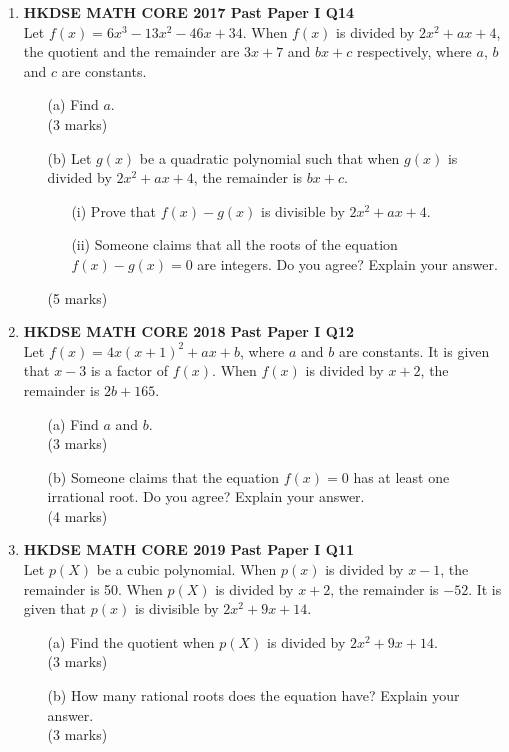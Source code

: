 \documentclass[12pt]{article}
\begin{document}
\begin{enumerate}
	\item \textbf{HKDSE MATH CORE 2017 Past Paper I Q14}\\
	Let $f(x) = 6x^3 - 13x^2 - 46x + 34$. When $f(x)$ is divided by $2x^2 + ax + 4$, the quotient and the remainder are $3x + 7$ and $bx + c$ respectively, where $a$, $b$ and $c$ are constants.
	\begin{enumerate}
		\item[(a)] Find $a$. \\(3 marks)
		\item[(b)] Let $g(x)$ be a quadratic polynomial such that when $g(x)$ is divided by $2x^2 + ax + 4$, the remainder is $bx + c$.
		\begin{enumerate}
			\item[(i)] Prove that  $f(x) - g(x)$ is divisible by $2x^2 + ax + 4$.
			\item[(ii)] Someone claims that all the roots of the equation  $f(x) - g(x) = 0$ are integers. Do you agree? Explain your answer.
		\end{enumerate}
		(5 marks)
	\end{enumerate}
	\newpage

	\item \textbf{HKDSE MATH CORE 2018 Past Paper I Q12}\\
	Let $f(x) = 4x(x+1)^2 + ax + b$, where $a$ and $b$ are constants. It is given that $x - 3$ is a factor of $f(x)$. When $f(x)$ is divided by $x + 2$, the remainder is $2b + 165$.
	\begin{enumerate}
		\item[(a)] Find $a$ and $b$. \\(3 marks)
		\item[(b)] Someone claims that the equation $f(x) = 0$ has at least one irrational root. Do you agree? Explain your answer. \\(4 marks)
	\end{enumerate}
	\newpage

	\item \textbf{HKDSE MATH CORE 2019 Past Paper I Q11}\\
	Let $p(X)$ be a cubic polynomial. When $p(x)$ is divided by $x - 1$, the remainder is 50. When $p(X)$ is divided by $x + 2$, the remainder is $-52$. It is given that $p(x)$ is divisible by $2x^2 + 9x + 14$.
	\begin{enumerate}
		\item[(a)] Find the quotient when $p(X)$ is divided by $2x^2 + 9x + 14$. \\(3 marks)
		\item[(b)] How many rational roots does the equation   have? Explain your answer. \\(3 marks)
	\end{enumerate}
	\newpage


\end{enumerate}
\end{document}
